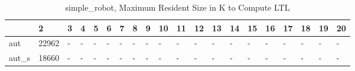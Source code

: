 \begin{table}
\caption{simple_robot, Maximum Resident Size in K to Compute LTL}
\label{simple_robot_LTL_size}
\begin{tabular}{llllllllllllllllllll}
\toprule
 & 2 & 3 & 4 & 5 & 6 & 7 & 8 & 9 & 10 & 11 & 12 & 13 & 14 & 15 & 16 & 17 & 18 & 19 & 20 \\
\midrule
aut & 22962 & - & - & - & - & - & - & - & - & - & - & - & - & - & - & - & - & - & - \\
aut_s & 18660 & - & - & - & - & - & - & - & - & - & - & - & - & - & - & - & - & - & - \\
\bottomrule
\end{tabular}
\end{table}
